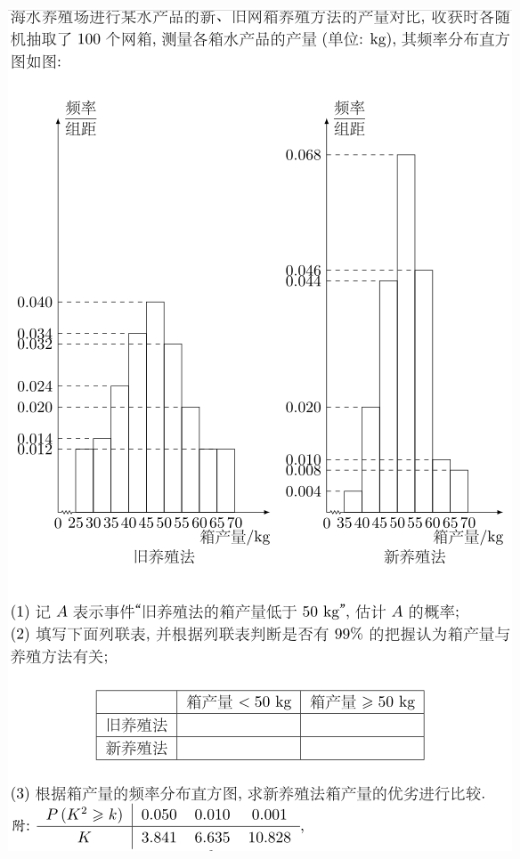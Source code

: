 \documentclass[11pt,a4paper]{ctexart}
\begin{document}
\begin{paracol}{2}
\includegraphics[width=\linewidth]{2017w19.png}
\newpage




\small
\switchcolumn

\newpage
{}
\newpage
{}
\newpage
{}
\newpage

\end{paracol}
\end{document}
